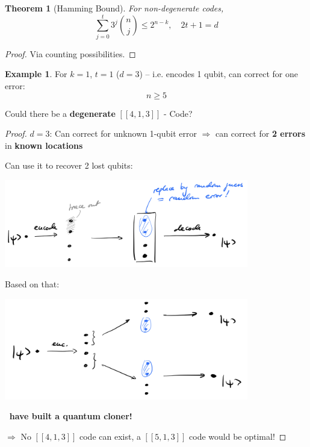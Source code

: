 \documentclass[a4paper, 12pt]{article}
\theoremstyle{plain}
\newtheorem*{theorem}{Theorem}
\theoremstyle{definition}
\newtheorem*{example}{Example}
\theoremstyle{remark}
\begin{document}
\begin{theorem}[Hamming Bound]
  For non-degenerate codes,
  \begin{equation*}
    \sum_{j=0}^t 3^j \binom{n}{j} \leq 2^{n-k}, \quad 2t+1=d
  \end{equation*}
\end{theorem}
\begin{proof}
  Via counting possibilities.
\end{proof}

\begin{example}
  For $k=1$, $t=1$ ($d=3$) -- i.e. encodes 1 qubit, can correct for one error:
  \[
    n\geq5
  \]

  Could there be a \textbf{degenerate} $[[4,1,3]]$ - Code?
  \begin{center}
  \end{center}

  \begin{proof}
    $d=3$: Can correct for unknown 1-qubit error $\Longrightarrow$ can correct for \textbf{2 errors} in \textbf{known locations}

    Can use it to recover 2 lost qubits:

    \begin{center}
      \includegraphics[width=0.8\textwidth]{image-4-1.png}
    \end{center}
    Based on that:
    \begin{center}
      \includegraphics[width=0.8\textwidth]{image-4-2.png}
    \end{center}

    \textbf{\Lightning \, have built a quantum cloner!}

    $\Longrightarrow$ No $[[4,1,3]]$ code can exist, a $[[5,1,3]]$  code would be optimal!
  \end{proof}
\end{example}
\end{document}
